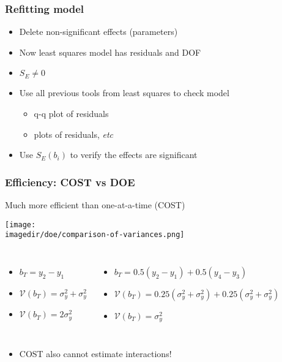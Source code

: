 \begin{frame}\frametitle{Refitting model}
	\begin{itemize}
		\item	Delete non-significant effects (parameters)
		\item	Now least squares model has residuals and DOF
		\item	$S_E \neq 0$
		\item	Use all previous tools from least squares to check model
		\begin{itemize}
			\item	q-q plot of residuals
			\item	plots of residuals, \emph{etc}
		\end{itemize}
		\item	Use $S_E(b_i)$ to verify the effects are significant
	\end{itemize}
\end{frame}

\begin{frame}\frametitle{Efficiency: COST vs DOE}
	\begin{block}{Much more efficient than one-at-a-time (COST)}
		\begin{center}
			\texttt{[image: \\imagedir/doe/comparison-of-variances.png]}
		\end{center}
	\end{block}
	\begin{columns}
		\column{4cm}
			\begin{itemize}
				\item	$b_T = y_2 - y_1$
				\item	$\mathcal{V}(b_T) = \sigma_y^2 + \sigma_y^2$
				\item	$\mathcal{V}(b_T) = 2\sigma_y^2$
			\end{itemize}
		\column{6cm}
			\begin{itemize}
				\item	$b_T = 0.5(y_2 - y_1) + 0.5(y_4 - y_3)$
				\item	$\mathcal{V}(b_T) = 0.25(\sigma_y^2 + \sigma_y^2) + 0.25(\sigma_y^2 + \sigma_y^2)$
				\item	$\mathcal{V}(b_T) = \sigma_y^2$
			\end{itemize}
	\end{columns}
	\begin{itemize}
		\item	COST also cannot estimate interactions!
	\end{itemize}
\end{frame}

